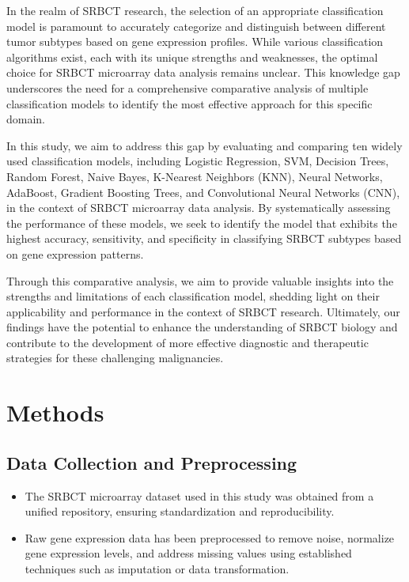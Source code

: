 \documentclass{article}
\begin{document}
In the realm of SRBCT research, the selection of an appropriate classification model is paramount to accurately categorize and distinguish between different tumor subtypes based on gene expression profiles. While various classification algorithms exist, each with its unique strengths and weaknesses, the optimal choice for SRBCT microarray data analysis remains unclear. This knowledge gap underscores the need for a comprehensive comparative analysis of multiple classification models to identify the most effective approach for this specific domain.

In this study, we aim to address this gap by evaluating and comparing ten widely used classification models, including Logistic Regression, SVM, Decision Trees, Random Forest, Naive Bayes, K-Nearest Neighbors (KNN), Neural Networks, AdaBoost, Gradient Boosting Trees, and Convolutional Neural Networks (CNN), in the context of SRBCT microarray data analysis. By systematically assessing the performance of these models, we seek to identify the model that exhibits the highest accuracy, sensitivity, and specificity in classifying SRBCT subtypes based on gene expression patterns.

Through this comparative analysis, we aim to provide valuable insights into the strengths and limitations of each classification model, shedding light on their applicability and performance in the context of SRBCT research. Ultimately, our findings have the potential to enhance the understanding of SRBCT biology and contribute to the development of more effective diagnostic and therapeutic strategies for these challenging malignancies.

\section{Methods}

\subsection{Data Collection and Preprocessing}
\begin{itemize}
   \item The SRBCT microarray dataset used in this study was obtained from a unified repository, ensuring standardization and reproducibility.
   \item Raw gene expression data has been preprocessed to remove noise, normalize gene expression levels, and address missing values using established techniques such as imputation or data transformation.
\end{itemize}
\end{document}
